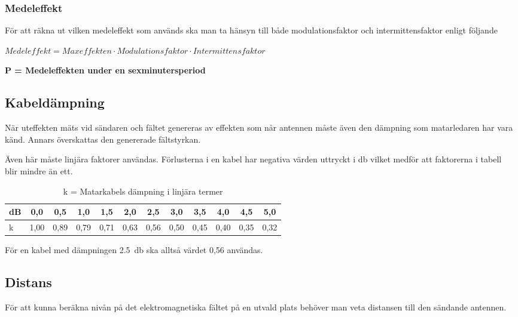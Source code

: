 \subsubsection{Medeleffekt}

För att räkna ut vilken medeleffekt som används ska man ta hänsyn
till både modulationsfaktor och intermittensfaktor enligt följande

\(\textit{Medeleffekt} = \textit{Maxeffekten} \cdot \textit{Modulationsfaktor} \cdot \textit{Intermittensfaktor}\)

\noindent\textbf{P = Medeleffekten under en sexminutersperiod}

\subsection{Kabeldämpning}

När uteffekten mäts vid sändaren och fältet genereras av effekten som
når antennen måste även den dämpning som matarledaren har vara känd.
Annars överskattas den genererade fältstyrkan.

Även här måste linjära faktorer användas.
Förlusterna i en kabel har negativa värden uttryckt i \unit{\decibel} vilket
medför att faktorerna i tabell~ blir mindre än ett.

\begin{table*}[ht]
  \begin{center}
    \begin{tabular}{|l|c|c|c|c|c|c|c|c|c|c|c|}
	\hline
	dB & 0,0  & 0,5  & 1,0  & 1,5  & 2,0  & 2,5  & 3,0  & 3,5  & 4,0  & 4,5  & 5,0 \\ \hline
	k  & 1,00 & 0,89 & 0,79 & 0,71 & 0,63 & 0,56 & 0,50 & 0,45 & 0,40 & 0,35 & 0,32 \\ \hline
    \end{tabular}
    \caption{k = Matarkabels dämpning i linjära termer}
    \label{tab:feedannut}
  \end{center}
\end{table*}

För en kabel med dämpningen \qty{2,5}{\decibel} ska alltså värdet 0,56 användas.

\subsection{Distans}

För att kunna beräkna nivån på det elektromagnetiska fältet på en utvald plats
behöver man veta distansen till den sändande antennen.

